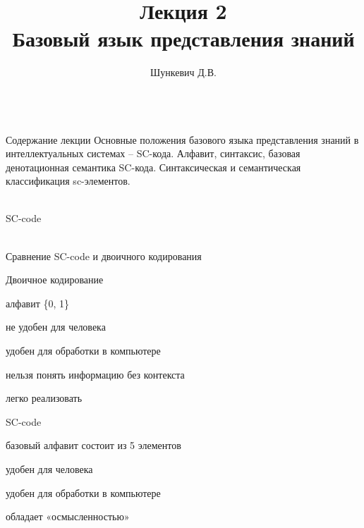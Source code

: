 \title{Лекция 2\\Базовый язык представления знаний}   
\author[]{Шункевич Д.В.}

\begin{frame}
	\titlepage
\end{frame}

\begin{frame}{\\Содержание лекции}
	\topline
	\justifying
	Основные положения базового языка представления знаний в интеллектуальных системах – SC-кода.
	Алфавит, синтаксис, базовая денотационная семантика SC-кода.
	Синтаксическая и семантическая классификация sc-элементов.
\end{frame}

\begin{frame}{\\SC-code}
	\begin{SCn}
	\end{SCn}
\end{frame}

\begin{frame}{\\Сравнение SC-code и двоичного кодирования}
	\vspace{10mm}
	\begin{textitemize}
		\item Двоичное кодирование
			\begin{textitemize}
				\item {алфавит \{0, 1\}}
				\item {не удобен для человека}
				\item {удобен для обработки в компьютере}
				\item {нельзя понять информацию без контекста}
				\item {легко реализовать}
			\end{textitemize}
		\item SC-code
			\begin{textitemize}
				\item {базовый алфавит состоит из 5 элементов}
				\item {удобен для человека}
				\item {удобен для обработки в компьютере}
				\item {обладает «осмысленностью»}
			\end{textitemize}
		\end{textitemize}
\end{frame}


